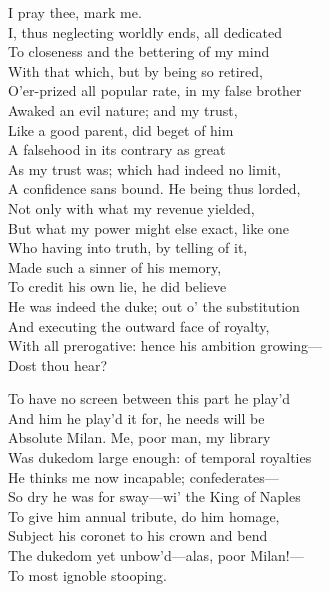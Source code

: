\begin{verse_speech}[Prospero] 
I pray thee, mark me.\\
I, thus neglecting worldly ends, all dedicated\\
To closeness and the bettering of my mind\\
With that which, but by being so retired,\\
O'er-prized all popular rate, in my false brother\\
Awaked an evil nature; and my trust,\\
Like a good parent, did beget of him\\
A falsehood in its contrary as great\\
As my trust was; which had indeed no limit,\\
A confidence sans bound. He being thus lorded,\\
Not only with what my revenue yielded,\\
But what my power might else exact, like one\\
Who having into truth, by telling of it,\\
Made such a sinner of his memory,\\
To credit his own lie, he did believe\\
He was indeed the duke; out o' the substitution\\
And executing the outward face of royalty,\\
With all prerogative: hence his ambition growing—\\
Dost thou hear?
\end{verse_speech}

	
\begin{verse_speech}[Prospero] 
To have no screen between this part he play'd\\
And him he play'd it for, he needs will be\\
Absolute Milan. Me, poor man, my library\\
Was dukedom large enough: of temporal royalties\\
He thinks me now incapable; confederates—\\
So dry he was for sway—wi' the King of Naples\\
To give him annual tribute, do him homage,\\
Subject his coronet to his crown and bend\\
The dukedom yet unbow'd—alas, poor Milan!—\\
To most ignoble stooping.
\end{verse_speech}

